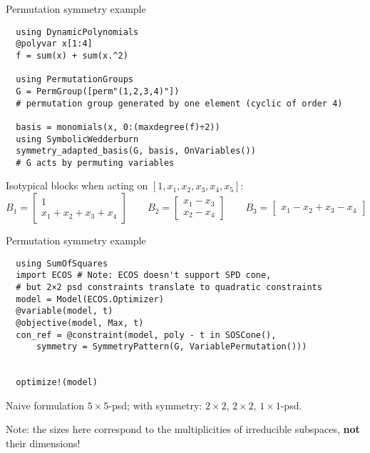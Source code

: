 \begin{frame}[fragile]{Permutation symmetry example}
\footnotesize
\begin{verbatim}
  using DynamicPolynomials
  @polyvar x[1:4]
  f = sum(x) + sum(x.^2)

  using PermutationGroups
  G = PermGroup([perm"(1,2,3,4)"])
  # permutation group generated by one element (cyclic of order 4)

  basis = monomials(x, 0:(maxdegree(f)÷2))
  using SymbolicWedderburn
  symmetry_adapted_basis(G, basis, OnVariables())
  # G acts by permuting variables
\end{verbatim}

Isotypical blocks when acting on $[1, x_1, x_2, x_3, x_4, x_5]$:
\[
  B_1 = \begin{bmatrix}
          1\\
          x_1 + x_2 + x_3 + x_4
        \end{bmatrix}
  \qquad
  B_2 = \begin{bmatrix}
          x_1 - x_3\\
          x_2 - x_4
        \end{bmatrix}
  \qquad
  B_3 = \begin{bmatrix}
          x_1 - x_2 + x_3 - x_4
        \end{bmatrix}
\]
\end{frame}

\begin{frame}[fragile]{Permutation symmetry example}
\footnotesize
\begin{verbatim}
  using SumOfSquares
  import ECOS # Note: ECOS doesn't support SPD cone,
  # but 2×2 psd constraints translate to quadratic constraints
  model = Model(ECOS.Optimizer)
  @variable(model, t)
  @objective(model, Max, t)
  con_ref = @constraint(model, poly - t in SOSCone(), 
      symmetry = SymmetryPattern(G, VariablePermutation())) 
  
      
  optimize!(model)
\end{verbatim}

\normalsize
Naive formulation $5\times 5$-psd; with symmetry: $2\times 2$, $2\times 2$, $1\times 1$-psd.

Note: the sizes here correspond to the multiplicities of irreducible subspaces, \textbf{not} their dimensions!

\end{frame}

